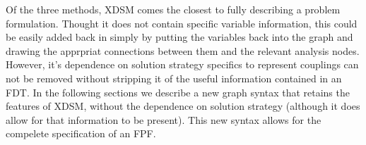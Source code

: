     Of the three methods, XDSM comes the closest to fully describing a problem formulation. 
    Thought it does not contain specific variable information, this could be easily added back in
    simply by putting the variables back into the graph and drawing the apprpriat connections
    between them and the relevant analysis nodes. However, it's dependence on 
    solution strategy specifics to represent couplings can not be removed without 
    stripping it of the useful information contained in an FDT. In the following sections
    we describe a new graph syntax that retains the features of XDSM, without the dependence on 
    solution strategy (although it does allow for that information to be present). This 
    new syntax allows for the compelete specification of an FPF. 